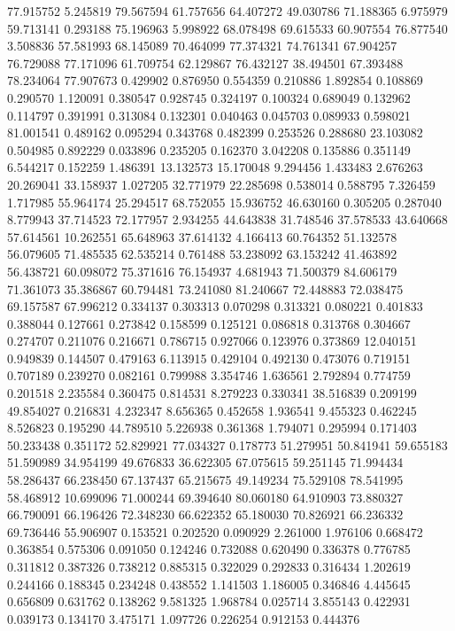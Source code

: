 77.915752
5.245819
79.567594
61.757656
64.407272
49.030786
71.188365
6.975979
59.713141
0.293188
75.196963
5.998922
68.078498
69.615533
60.907554
76.877540
3.508836
57.581993
68.145089
70.464099
77.374321
74.761341
67.904257
76.729088
77.171096
61.709754
62.129867
76.432127
38.494501
67.393488
78.234064
77.907673
0.429902
0.876950
0.554359
0.210886
1.892854
0.108869
0.290570
1.120091
0.380547
0.928745
0.324197
0.100324
0.689049
0.132962
0.114797
0.391991
0.313084
0.132301
0.040463
0.045703
0.089933
0.598021
81.001541
0.489162
0.095294
0.343768
0.482399
0.253526
0.288680
23.103082
0.504985
0.892229
0.033896
0.235205
0.162370
3.042208
0.135886
0.351149
6.544217
0.152259
1.486391
13.132573
15.170048
9.294456
1.433483
2.676263
20.269041
33.158937
1.027205
32.771979
22.285698
0.538014
0.588795
7.326459
1.717985
55.964174
25.294517
68.752055
15.936752
46.630160
0.305205
0.287040
8.779943
37.714523
72.177957
2.934255
44.643838
31.748546
37.578533
43.640668
57.614561
10.262551
65.648963
37.614132
4.166413
60.764352
51.132578
56.079605
71.485535
62.535214
0.761488
53.238092
63.153242
41.463892
56.438721
60.098072
75.371616
76.154937
4.681943
71.500379
84.606179
71.361073
35.386867
60.794481
73.241080
81.240667
72.448883
72.038475
69.157587
67.996212
0.334137
0.303313
0.070298
0.313321
0.080221
0.401833
0.388044
0.127661
0.273842
0.158599
0.125121
0.086818
0.313768
0.304667
0.274707
0.211076
0.216671
0.786715
0.927066
0.123976
0.373869
12.040151
0.949839
0.144507
0.479163
6.113915
0.429104
0.492130
0.473076
0.719151
0.707189
0.239270
0.082161
0.799988
3.354746
1.636561
2.792894
0.774759
0.201518
2.235584
0.360475
0.814531
8.279223
0.330341
38.516839
0.209199
49.854027
0.216831
4.232347
8.656365
0.452658
1.936541
9.455323
0.462245
8.526823
0.195290
44.789510
5.226938
0.361368
1.794071
0.295994
0.171403
50.233438
0.351172
52.829921
77.034327
0.178773
51.279951
50.841941
59.655183
51.590989
34.954199
49.676833
36.622305
67.075615
59.251145
71.994434
58.286437
66.238450
67.137437
65.215675
49.149234
75.529108
78.541995
58.468912
10.699096
71.000244
69.394640
80.060180
64.910903
73.880327
66.790091
66.196426
72.348230
66.622352
65.180030
70.826921
66.236332
69.736446
55.906907
0.153521
0.202520
0.090929
2.261000
1.976106
0.668472
0.363854
0.575306
0.091050
0.124246
0.732088
0.620490
0.336378
0.776785
0.311812
0.387326
0.738212
0.885315
0.322029
0.292833
0.316434
1.202619
0.244166
0.188345
0.234248
0.438552
1.141503
1.186005
0.346846
4.445645
0.656809
0.631762
0.138262
9.581325
1.968784
0.025714
3.855143
0.422931
0.039173
0.134170
3.475171
1.097726
0.226254
0.912153
0.444376
